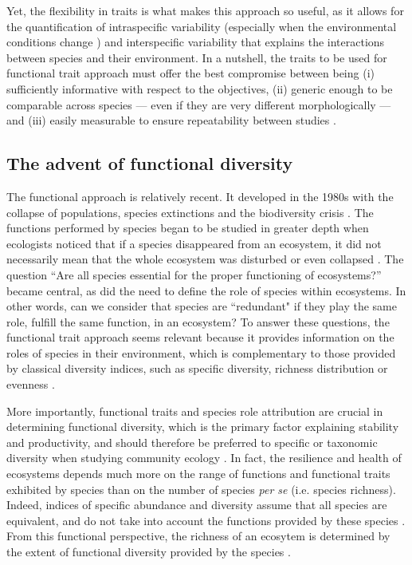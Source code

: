 Yet, the flexibility in traits is what makes this approach so useful, as it allows for the quantification of intraspecific variability (especially when the environmental conditions change \citet{martini2020}) and interspecific variability that explains the interactions between species and their environment. In a nutshell, the traits to be used for functional trait approach must offer the best compromise between being (i) sufficiently informative with respect to the objectives, (ii) generic enough to be comparable across species --- even if they are very different morphologically --- and (iii) easily measurable to ensure repeatability between studies \citep{dumay2004, kremer2017}.

\subsection{The advent of functional diversity}
The functional approach is relatively recent. It developed in the 1980s with the collapse of populations, species extinctions and the biodiversity crisis \citep{wilson1988}. The functions performed by species began to be studied in greater depth when ecologists noticed that if a species disappeared from an ecosystem, it did not necessarily mean that the whole ecosystem was disturbed or even collapsed \citep{mejri2009}. The question ``Are all species essential for the proper functioning of ecosystems?'' became central, as did the need to define the role of species within ecosystems. In other words, can we consider that species are ``redundant" if they play the same role, fulfill the same function, in an ecosystem? To answer these questions, the functional trait approach seems relevant because it provides information on the roles of species in their environment, which is complementary to those provided by classical diversity indices, such as specific diversity, richness distribution or evenness \citep{marcon2015,mejri2009}. 

More importantly, functional traits and species role attribution are crucial in determining functional diversity, which is the primary factor explaining stability and productivity, and should therefore be preferred to specific or taxonomic diversity when studying community ecology \citep{dumay2004,mejri2009}. In fact, the resilience and health of ecosystems depends much more on the range of functions and functional traits exhibited by species than on the number of species \textit{per se} (i.e. species richness). Indeed, indices of specific abundance and diversity assume that all species are equivalent, and do not take into account the functions provided by these species \citep{mejri2009}. From this functional perspective, the richness of an ecosytem is determined by the extent of functional diversity provided by the species \citep{rocklin2004}. 

